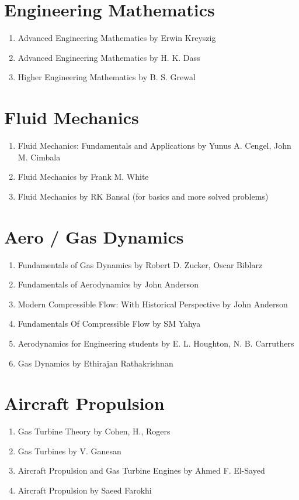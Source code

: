 \section{Engineering Mathematics}
\begin{enumerate}
  \item Advanced Engineering Mathematics by Erwin Kreyszig
  \item Advanced Engineering Mathematics by H. K. Dass
  \item Higher Engineering Mathematics by B. S. Grewal
\end{enumerate}

\section{Fluid Mechanics}
\begin{enumerate}
  \item Fluid Mechanics: Fundamentals and Applications by Yunus A. Cengel, John M. Cimbala
  \item Fluid Mechanics by Frank M. White
  \item Fluid Mechanics by RK Bansal (for basics and more solved problems)
\end{enumerate}

\section{Aero / Gas Dynamics}
\begin{enumerate}
  \item Fundamentals of Gas Dynamics by Robert D. Zucker, Oscar Biblarz
  \item Fundamentals of Aerodynamics by John Anderson
  \item Modern Compressible Flow: With Historical Perspective by John Anderson
  \item Fundamentals Of Compressible Flow by SM Yahya
  \item Aerodynamics for Engineering students by E. L. Houghton, N. B. Carruthers
  \item Gas Dynamics by Ethirajan Rathakrishnan
\end{enumerate}

\section{Aircraft Propulsion}
\begin{enumerate}
  \item Gas Turbine Theory by Cohen, H., Rogers
  \item Gas Turbines by V. Ganesan
  \item Aircraft Propulsion and Gas Turbine Engines by Ahmed F. El-Sayed
  \item Aircraft Propulsion by Saeed Farokhi
\end{enumerate}

